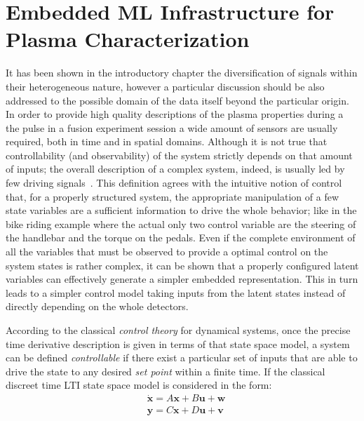 
\chapter{Embedded ML Infrastructure for Plasma Characterization}
\label{section:4_embedded_ML}

It has been shown in the introductory chapter the diversification of signals within their heterogeneous nature, however a particular discussion should be also addressed to the possible domain of the data itself beyond the particular origin.
In order to provide high quality descriptions of the plasma properties during a the pulse in a fusion experiment session a wide amount of sensors are usually required, both in time and in spatial domains.
Although it is not true that controllability (and observability) of the system strictly depends on that amount of inputs; the overall description of a complex system, indeed, is usually led by few driving signals~\cite{Liu2011}. 
This definition agrees with the intuitive notion of control that, for a properly structured system, the appropriate manipulation of a few state variables are a sufficient information to drive the whole behavior; like in the bike riding example where the actual only two control variable are the steering of the handlebar and the torque on the pedals. Even if the complete environment of all the variables that must be observed to provide a optimal control on the system states is rather complex, it can be shown that a properly configured latent variables can effectively generate a simpler embedded representation. This in turn leads to a simpler control model taking inputs from the latent states instead of directly depending on the whole detectors.

According to the classical \textit{control theory} for dynamical systems, once the precise time derivative description is given in terms of that state space model, a system can be defined \textit{controllable} if there exist a particular set of inputs that are able to drive the state to any desired \textit{set point} within a finite time. 
If the classical discreet time \ac{LTI} state space model is considered in the form:
\begin{align}
    & \dot{\bm{x}} = A\bm{x} + B\bm{u} + \bm{w}\\
    & \bm{y} = C\bm{x} + D\bm{u} + \bm{v}
    \label{eq:ss_model}
\end{align}

